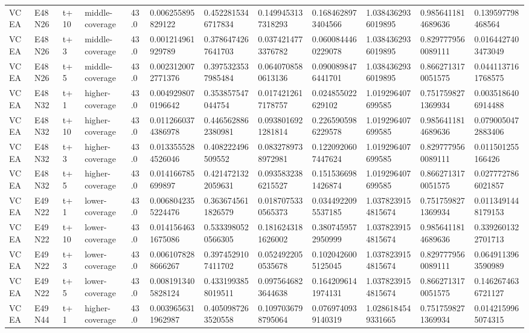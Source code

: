 \begin{landscape}
\begin{longtable}{llllllllllll}
VCEA & E48N26 & t+10 & middle-coverage & 43.0 & 0.006255895829122 & 0.4522815346717834 & 0.1499453137318293 & 0.1684628973404566 & 1.0384362936019895 & 0.9856411814689636 & 0.139597798468564 \\
VCEA & E48N26 & t+3 & middle-coverage & 43.0 & 0.001214961929789 & 0.3786474267641703 & 0.0374214773376782 & 0.0600844460229078 & 1.0384362936019895 & 0.8297779560089111 & 0.0164427403473049 \\
VCEA & E48N26 & t+5 & middle-coverage & 43.0 & 0.0023120072771376 & 0.3975323537985484 & 0.0640708580613136 & 0.0900898476441701 & 1.0384362936019895 & 0.8662713170051575 & 0.0441137161768575 \\
VCEA & E48N32 & t+1 & higher-coverage & 43.0 & 0.0049298070196642 & 0.353857547044754 & 0.0174212617178757 & 0.024855022629102 & 1.019296407699585 & 0.7517598271369934 & 0.0035186406914488 \\
VCEA & E48N32 & t+10 & higher-coverage & 43.0 & 0.0112660374386978 & 0.4465628862380981 & 0.0938016921281814 & 0.2265905986229578 & 1.019296407699585 & 0.9856411814689636 & 0.0790050472883406 \\
VCEA & E48N32 & t+3 & higher-coverage & 43.0 & 0.0133555284526046 & 0.408222496509552 & 0.0832789738972981 & 0.1220920607447624 & 1.019296407699585 & 0.8297779560089111 & 0.011501255166426 \\
VCEA & E48N32 & t+5 & higher-coverage & 43.0 & 0.014166785699897 & 0.4214721322059631 & 0.0935832386215527 & 0.1515366981426874 & 1.019296407699585 & 0.8662713170051575 & 0.0277727866021857 \\
VCEA & E49N22 & t+1 & lower-coverage & 43.0 & 0.0068042355224476 & 0.3636745611826579 & 0.0187075330565373 & 0.0344922095537185 & 1.0378239154815674 & 0.7517598271369934 & 0.0113491448179153 \\
VCEA & E49N22 & t+10 & lower-coverage & 43.0 & 0.0141564631675086 & 0.5333980520566305 & 0.1816243181626002 & 0.3807459572950999 & 1.0378239154815674 & 0.9856411814689636 & 0.3392601322701713 \\
VCEA & E49N22 & t+3 & lower-coverage & 43.0 & 0.0061078288666267 & 0.3974529107411702 & 0.0524922050535678 & 0.1020426005125045 & 1.0378239154815674 & 0.8297779560089111 & 0.0649113963590989 \\
VCEA & E49N22 & t+5 & lower-coverage & 43.0 & 0.0081913405828124 & 0.4331993858019511 & 0.0975646823644638 & 0.1642096141974131 & 1.0378239154815674 & 0.8662713170051575 & 0.1462674636721127 \\
VCEA & E49N44 & t+1 & higher-coverage & 43.0 & 0.0039656311962987 & 0.4050987263520558 & 0.1097036798795064 & 0.0769740939140319 & 1.0286184549331665 & 0.7517598271369934 & 0.0142159965074315 \\

\end{longtable}
\end{landscape}
